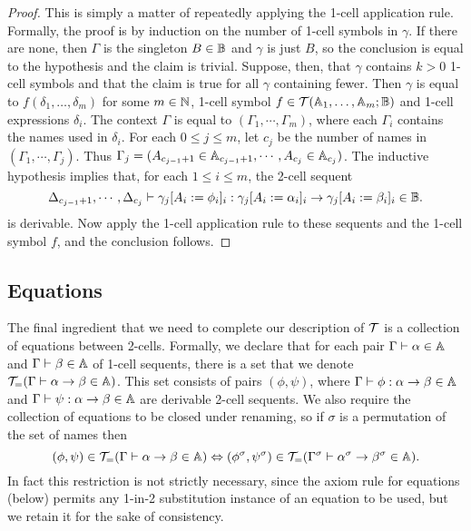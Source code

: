 \documentclass{robinthesisdraft}
\begin{document}
\begin{proof}
	This is simply a matter of repeatedly applying the 1-cell application
	rule. Formally,
	the proof is by induction on the number of 1-cell symbols in $\gamma$.
	If there are none, then $\Gamma$ is the singleton $B\in\mathbb{B}$ and $\gamma$
	is just $B$, so the conclusion is equal	to the hypothesis and the claim
	is trivial. Suppose, then, that $\gamma$ contains $k>0$ 1-cell symbols
	and that the claim is true for all $\gamma$ containing fewer. Then
	$\gamma$ is equal to $f(\delta_{1}, \dots, \delta_{m})$ for some
	$m\in\mathbb{N}$, 1-cell symbol $f\in{\mathcal{T}}(\mathbb{A}_{1}, \dots, \mathbb{A}_{m}; \mathbb{B})$ and
	1-cell expressions $\delta_{i}$. The context $\Gamma$ is equal to
	$(\Gamma_{1}, \cdots, \Gamma_{m})$, where each $\Gamma_{i}$ contains
	the names used in $\delta_{i}$.
	For each $0\leq j\leq m$, let $c_{j}$ be the number of names in
	$(\Gamma_{1},\cdots,\Gamma_{j})$. Thus
	$\Gamma_{j} = (A_{c_{j-1}+1}\in\mathbb{A}_{c_{j-1}+1}, \cdots, A_{c_{j}}\in\mathbb{A}_{c_{j}})$.
	The inductive hypothesis implies that, for each $1\leq i\leq m$, the
	2-cell sequent
	\[
	\Delta_{c_{j-1}+1},\cdots,\Delta_{c_{j}}\vdash \gamma_{j}[A_{i} := \phi_{i}]_{i}
		: \gamma_{j}[A_{i} := \alpha_{i}]_{i} \to \gamma_{j}[A_{i} := \beta_{i}]_{i}
		\in\mathbb{B}.
	\]
	is derivable. Now apply the 1-cell application rule to these sequents and
	the 1-cell symbol $f$, and the conclusion follows.
\end{proof}

\subsection{Equations}
The final ingredient that we need to complete our description
of ${\mathcal{T}}$ is a collection of equations between 2-cells.
Formally, we declare that for each pair
$\Gamma\vdash\alpha\in\mathbb{A}$ and $\Gamma\vdash\beta\in\mathbb{A}$ of
1-cell sequents, there is a set that we denote
${\mathcal{T}}_{=}(\Gamma\vdash \alpha\to\beta\in\mathbb{A})$. This set consists
of pairs $(\phi,\psi)$,
where $\Gamma\vdash\phi:\alpha\to\beta\in\mathbb{A}$ and
$\Gamma\vdash\psi:\alpha\to\beta\in\mathbb{A}$ are derivable
2-cell sequents.
%
We also require the collection of equations to be closed under renaming,
so if $\sigma$ is a permutation of the set of names then
\[
	(\phi,\psi)\in{\mathcal{T}}_{=}(\Gamma\vdash \alpha\to\beta\in\mathbb{A})
	\Leftrightarrow 
	(\phi^{\sigma},\psi^{\sigma})\in{\mathcal{T}}_{=}(\Gamma^{\sigma}\vdash \alpha^{\sigma}\to\beta^{\sigma}\in\mathbb{A}).
\]
In fact this restriction is not strictly necessary, since the
axiom rule for equations (below) permits any 1-in-2 substitution instance
of an equation to be used, but we retain it for the sake of
consistency.
\end{document}
